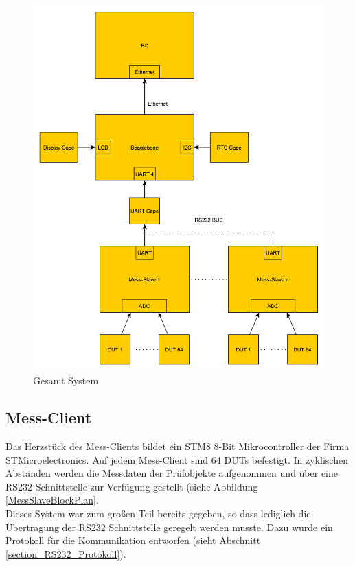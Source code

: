 \begin{figure}[H]
\begin{center}
\includegraphics[width=\textwidth]{img/general/BlockPlan.pdf}
\caption{Gesamt System}
\label{Gesamt_System}
\end{center}
\end{figure}


\subsection{Mess-Client}
\label{section_Mess-Client}

Das Herzstück des Mess-Clients bildet ein STM8  8-Bit Mikrocontroller der Firma STMicroelectronics.
Auf jedem Mess-Client sind 64 \acp{DUT} befestigt. In zyklischen Abständen werden die Messdaten der Prüfobjekte aufgenommen und über eine RS232-Schnittstelle zur Verfügung gestellt (siehe Abbildung \ref{MessSlaveBlockPlan}.\\
Dieses System war zum großen Teil bereits gegeben, so dass lediglich die Übertragung der RS232 Schnittstelle geregelt werden musste. Dazu wurde ein Protokoll für die Kommunikation entworfen (sieht Abschnitt \ref{section_RS232_Protokoll}).
 

